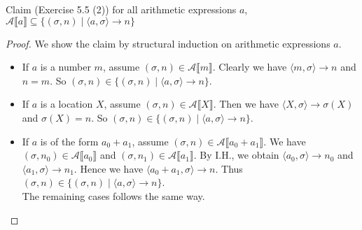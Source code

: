 \documentclass[12pt,aspectratio=169]{beamer}
\newcommand{\denoA}[1]{\mathcal{A} \llbracket #1 \rrbracket}
\newcommand{\deriv}[3]{\langle #1, #2 \rangle \rightarrow #3}
\begin{document}
\begin{frame}
    \begin{block}{Claim (Exercise 5.5 (2))}
        for all arithmetic expressions $a$, $\denoA{a} \subseteq \{(\sigma,n) \mid \deriv{a}{\sigma}{n}\}$
    \end{block}
    \begin{proof}
        We show the claim by structural induction on arithmetic expressions $a$.
        \pause
        \begin{itemize}[<+->]
            \item If $a$ is a number $m$, assume $(\sigma, n) \in \denoA{m}$. Clearly we have $\deriv{m}{\sigma}{n}$
                and $n = m$. So $(\sigma,n) \in \{(\sigma, n) \mid \deriv{a}{\sigma}{n}\}$.
            \item If $a$ is a location $X$, assume $(\sigma, n) \in \denoA{X}$.
                Then we have $\deriv{X}{\sigma}{\sigma(X)}$ and $\sigma(X) = n$. So $(\sigma,n) \in \{(\sigma, n) \mid \deriv{a}{\sigma}{n}\}$.
            \item If $a$ is of the form $a_0 + a_1$, assume $(\sigma, n) \in \denoA{a_0 + a_1}$.
                    We have $(\sigma,n_0) \in \denoA{a_0}$ and $(\sigma, n_1) \in \denoA{a_1}$.
                    By I.H., we obtain $\deriv{a_0}{\sigma}{n_0}$ and $\deriv{a_1}{\sigma}{n_1}$.
                    Hence we have $\deriv{a_0 + a_1}{\sigma}{n}$.
                    Thus $(\sigma,n) \in \{(\sigma, n) \mid \deriv{a}{\sigma}{n}\}$.\\

                    The remaining cases follows the same way.
        \end{itemize}
    \end{proof}
\end{frame}
\end{document}
